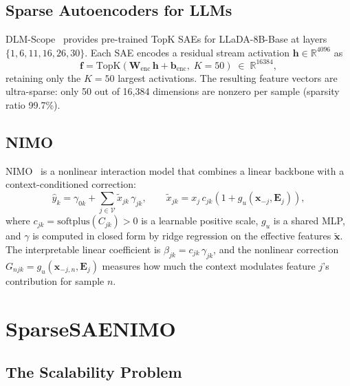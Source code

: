 \documentclass[11pt]{article}
\newcommand{\bfx}{\mathbf{x}}
\newcommand{\bfh}{\mathbf{h}}
\newcommand{\softplus}{\mathrm{softplus}}
\begin{document}
\subsection{Sparse Autoencoders for LLMs}

DLM-Scope~\citep{dlmscope2024} provides pre-trained TopK SAEs for LLaDA-8B-Base at layers $\{1, 6, 11, 16, 26, 30\}$.
Each SAE encodes a residual stream activation $\bfh \in \mathbb{R}^{4096}$ as
\begin{equation}
    \mathbf{f} = \mathrm{TopK}(\mathbf{W}_{\mathrm{enc}}\,\bfh + \mathbf{b}_{\mathrm{enc}},\;K=50) \;\in\; \mathbb{R}^{16384},
\end{equation}
retaining only the $K = 50$ largest activations. The resulting feature vectors are ultra-sparse: only 50 out of 16,384 dimensions are nonzero per sample (sparsity ratio 99.7\%).

\subsection{NIMO}

NIMO~\citep{xu2026nimo} is a nonlinear interaction model that combines a linear backbone with a context-conditioned correction:
\begin{equation}
    \hat{y}_k = \gamma_{0k} + \sum_{j \in \mathcal{V}} \tilde{x}_{jk}\,\gamma_{jk},
    \qquad
    \tilde{x}_{jk} = x_j\,c_{jk}\!\left(1 + g_u(\bfx_{-j}, \mathbf{E}_j)\right),
\end{equation}
where $c_{jk} = \softplus(C_{jk}) > 0$ is a learnable positive scale, $g_u$ is a shared MLP, and $\gamma$ is computed in closed form by ridge regression on the effective features $\tilde{\mathbf{x}}$.
The interpretable linear coefficient is $\beta_{jk} = c_{jk}\,\gamma_{jk}$, and the nonlinear correction $G_{njk} = g_u(\bfx_{-j,n}, \mathbf{E}_j)$ measures how much the context modulates feature $j$'s contribution for sample $n$.

\section{SparseSAENIMO}

\subsection{The Scalability Problem}
\end{document}
